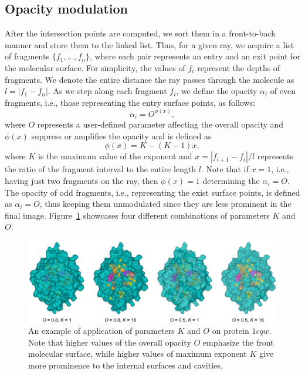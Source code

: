 \subsection{Opacity modulation}
After the intersection points are computed, we sort them in a front-to-back manner and store them to the linked list. 
Thus, for a given ray, we acquire a list of fragments $\{f_1,\ldots,f_n \}$, where each pair represents an entry and an exit point for the molecular surface. For simplicity, the values of $f_i$ represent the depths of fragments. 
We denote the entire distance the ray passes through the molecule as $l=|f_1-f_n|$. 
As we step along each fragment $f_i$, we define the opacity $\alpha_i$ of even fragments, i.e., those representing the entry surface points, as follows:
\begin{equation}
  \alpha_i = O^{\phi(x)},
	\label{eq:alphaDistEven}
\end{equation}	
where $O$ represents a user-defined parameter affecting the overall opacity and $\phi(x)$ suppress or amplifies the opacity and is defined as
\begin{equation}
  \phi(x) = K-(K-1)x,
	\label{eq:exponent}
\end{equation}	
where $K$ is the maximum value of the exponent and $x=|f_{i+1}-f_i|/l$ represents the ratio of the fragment interval to the entire length $l$. Note that if $x=1$, i.e., having just two fragments on the ray, then $\phi(x)=1$ determining the $\alpha_i=O$. The opacity of odd fragments, i.e., representing the exist surface points, is defined as $\alpha_i = O$, thus keeping them unmodulated since they are less prominent in the final image.
Figure~\ref{fig:Oparam} showcases four different combinations of parameters $K$ and $O$.
\begin{figure}[htb]
  \centering
  \includegraphics[width=\textwidth]{image/Oparam2.pdf}
  \caption{An example of application of parameters $K$ and $O$ on protein $1cqw$. Note that higher values of the overall opacity $O$ emphasize the front molecular surface, while higher values of maximum exponent $K$ give more prominence to the internal surfaces and cavities.}
	\label{fig:Oparam}
\end{figure}
